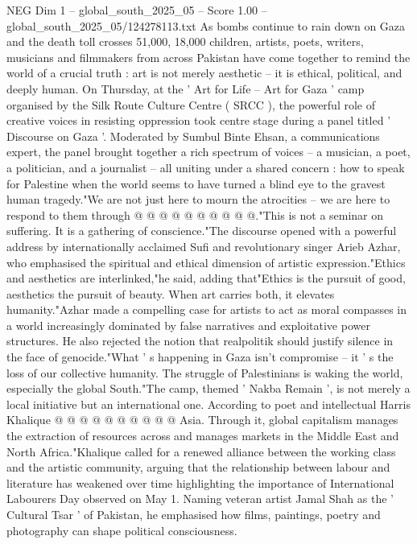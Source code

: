 \begin{textsample}{NEG Dim 1 – global\_south\_2025\_05 – Score 1.00 – global\_south\_2025\_05/124278113.txt}  \label{ex:f1_neg_172}
As bombs continue to rain down on Gaza and the death toll crosses 51,000, 18,000 children, artists, poets, writers, musicians and filmmakers from across Pakistan have come together to remind the world of a crucial truth : art is not merely aesthetic -- it is ethical, political, and deeply human.
On Thursday, at the ' Art for Life -- Art for Gaza ' camp organised by the Silk Route Culture Centre ( SRCC ), the powerful role of creative voices in resisting oppression took centre stage during a panel titled ' Discourse on Gaza '.
Moderated by Sumbul Binte Ehsan, a communications expert, the panel brought together a rich spectrum of voices -- a musician, a poet, a politician, and a journalist -- all uniting under a shared concern : how to speak for Palestine when the world seems to have turned a blind eye to the gravest human tragedy."We are not just here to mourn the atrocities -- we are here to respond to them through @ @ @ @ @ @ @ @ @ @."This is not a seminar on suffering.
It is a gathering of conscience."The discourse opened with a powerful address by internationally acclaimed Sufi and revolutionary singer Arieb Azhar, who emphasised the spiritual and ethical dimension of artistic expression."Ethics and aesthetics are interlinked,"he said, adding that"Ethics is the pursuit of good, aesthetics the pursuit of beauty.
When art carries both, it elevates humanity."Azhar made a compelling case for artists to act as moral compasses in a world increasingly dominated by false narratives and exploitative power structures.
He also rejected the notion that realpolitik should justify silence in the face of genocide."What ' s happening in Gaza isn't compromise -- it ' s the loss of our collective humanity.
The struggle of Palestinians is waking the world, especially the global South."The camp, themed ' Nakba Remain ', is not merely a local initiative but an international one.
According to poet and intellectual Harris Khalique @ @ @ @ @ @ @ @ @ @ Asia.
Through it, global capitalism manages the extraction of resources across and manages markets in the Middle East and North Africa."Khalique called for a renewed alliance between the working class and the artistic community, arguing that the relationship between labour and literature has weakened over time highlighting the importance of International Labourers Day observed on May 1.
Naming veteran artist Jamal Shah as the ' Cultural Tsar ' of Pakistan, he emphasised how films, paintings, poetry and photography can shape political consciousness.

\end{textsample}
